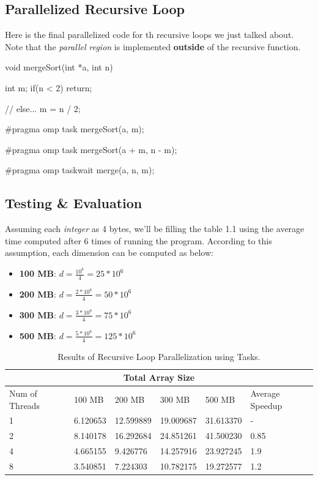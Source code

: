 \documentclass[12pt]{article}
\numberwithin{equation}{section}
\numberwithin{table}{section}
\numberwithin{figure}{section}
\begin{document}
\subsection{Parallelized Recursive Loop}
Here is the final parallelized code for th recursive loops we just talked about. Note that the \textit{parallel region} is implemented \textbf{outside} of the recursive function.
\begin{cpp}
		void mergeSort(int *a, int n) {
			
			int m;
			if(n < 2)
			return;
			
			// else...
			m = n / 2;
			
			#pragma omp task
			mergeSort(a, m);
			
			#pragma omp task
			mergeSort(a + m, n - m);
			
			#pragma omp taskwait
			merge(a, n, m);
		}
\end{cpp}

\subsection{Testing \& Evaluation}
Assuming each \textit{integer} as 4 bytes, we'll be filling the table 1.1 using the average time  computed after 6 times of running the program. According to this assumption, each dimension can be computed as below:
\begin{itemize}
	\item \textbf{100 MB}:  $d = \frac{10^8}{4} = 25 * 10^6$
	\item \textbf{200 MB}:  $d = \frac{2 * 10^8}{4} = 50 * 10^6$
	\item \textbf{300 MB}:  $d = \frac{3 * 10^8}{4} = 75 * 10^6$
	\item \textbf{500 MB}:  $d = \frac{5 * 10^8}{4} = 125 * 10^6$
\end{itemize}

\def\arraystretch{1.3}
\begin{table}[!h]
		\centering
\begin{tabular}{ |p{3cm}||p{2cm}|p{2cm}|p{2cm}|p{2cm}|p{1.5cm}|  }
	
	\hline
	\multicolumn{6}{|c|}{Total Array Size} \\
	\hline
	 Num of Threads & 100 MB & 200 MB & 300 MB & 500 MB & Average Speedup\\
	\hline
		1   & 6.120653    & 12.599889 & 19.009687  &   31.613370 &   -\\
		2   & 8.140178    & 16.292684 & 24.851261  &   41.500230 &   0.85\\
		4   & 4.665155    & 9.426776  & 14.257916  &   23.927245 &   1.9\\
		8   & 3.540851    & 7.224303  & 10.782175  &   19.272577 & 1.2\\
	\hline
\end{tabular}
	\caption{Results of Recursive Loop Parallelization using Tasks.}
\label{figsolplot}
\end{table}
\end{document}
